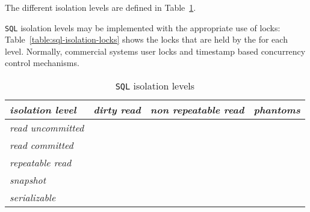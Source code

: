 \documentclass[english]{article}
\begin{document}
The different isolation levels are defined in Table~\ref{table:sql-isolation-levels}.

\bigskip
\texttt{SQL} isolation levels may be implemented with the appropriate use of locks: Table~\ref{table:sql-isolation-locks} shows the locks that are held by the \DBMS for each level.
Normally, commercial systems user locks and timestamp based concurrency control mechanisms.

\begin{table}[htbp]
  \centering
  \bigskip
  \begin{tabular}{l|c|c|c}
    \textit{isolation level}  & \textit{dirty read} & \textit{non repeatable read} & \textit{phantoms} \\
    \hline
    \textit{read uncommitted} &          &                   &        \\
    \textit{read committed}   &          &                   &        \\
    \textit{repeatable read}  &          &                   &        \\
    \textit{snapshot}         &          &                   &        \\
    \textit{serializable}     &          &                   &        \\
  \end{tabular}
  \caption{\texttt{SQL} isolation levels}
  \label{table:sql-isolation-levels}
  \bigskip
\end{table}

\begin{sidewaystable}[htbp]
  \centering
  \bigskip
  \caption{\texttt{SQL} isolation levels and locks}
  \label{table:sql-isolation-locks}
\end{sidewaystable}
\end{document}
